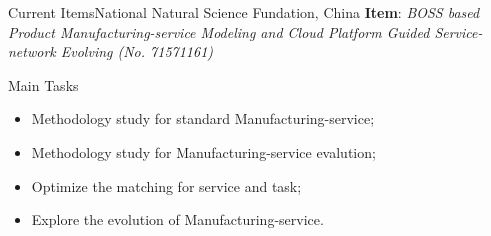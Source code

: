 \begin{frame}{Current Items}{National Natural Science Fundation, China}
\textbf{Item}: \textit{BOSS based Product Manufacturing-service Modeling and Cloud Platform Guided Service-network Evolving (No. 71571161)}
\begin{block}{Main Tasks}
\begin{itemize}
\item Methodology study for standard Manufacturing-service;
\item Methodology study for Manufacturing-service evalution;
\item Optimize the matching for service and task;
\item Explore the evolution of Manufacturing-service.
\end{itemize}
\end{block}
\end{frame}